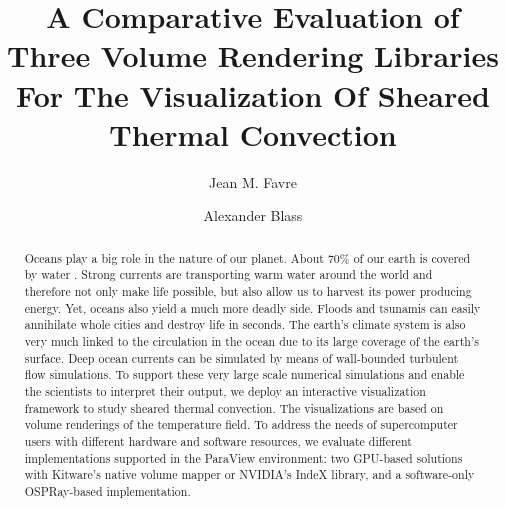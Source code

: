 \documentclass[5p,times]{elsarticle}
\begin{document}
\begin{frontmatter}



\title{A Comparative Evaluation of Three Volume Rendering Libraries For The Visualization Of Sheared Thermal Convection}


\author[CSCS]{Jean M. Favre}
\author[Twente]{Alexander Blass}

\address[CSCS]{Swiss National Supercomputing Center (CSCS), Via Trevano 131, CH-6900 Lugano, Switzerland}
\address[Twente]{Physics of Fluids Group, Max Planck Center for Complex Fluid Dynamics,
J. M. Burgers Center for Fluid Dynamics and MESA+ Research Institute,
Department of Science and Technology,
University of Twente, P.O. Box 217, 7500 AE Enschede, The Netherlands}

\begin{abstract}
Oceans play a big role in the nature of our planet. About $ 70 \% $ of our earth
is covered by water \cite{int14}. Strong currents are transporting warm water around the world
and therefore not only make life possible, but also allow us to harvest its
power producing energy. Yet, oceans also
yield a much more deadly side. Floods and tsunamis can easily annihilate whole
cities and destroy life in seconds. The earth's climate system is also very much
linked to the circulation in the ocean due to its large coverage of the earth's surface.
Deep ocean currents can be simulated by means of wall-bounded turbulent flow simulations.
To support these very large scale numerical simulations and enable the scientists to interpret their output,
we deploy an interactive visualization framework to study sheared thermal convection.
The visualizations are based on volume renderings of the temperature field.
To address the needs of supercomputer users with different hardware and software resources,
we evaluate different implementations supported in the ParaView \cite{Ahrens2005} environment:
two GPU-based solutions with Kitware's native volume mapper or NVIDIA's IndeX library,
and a software-only OSPRay-based implementation.


\end{abstract}
\end{frontmatter}
\end{document}
